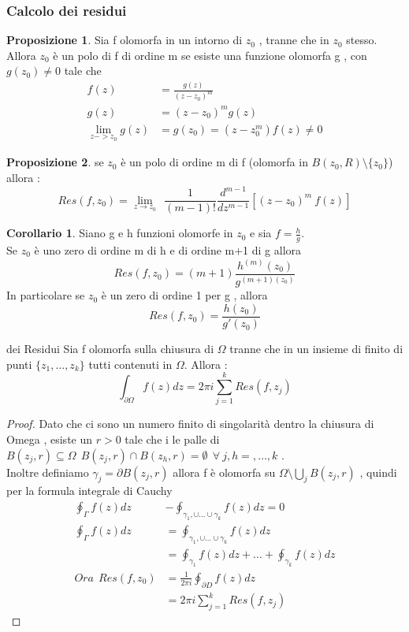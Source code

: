 \documentclass{article}
\theoremstyle{definition}
\newtheorem*{corollario}{Corollario}
\newtheorem*{proposizione}{Proposizione}
\begin{document}
	\subsubsection{Calcolo dei residui}
	\begin{tcolorbox}
	\begin{proposizione}
		Sia f olomorfa in un intorno di $z_0$ , tranne che in $z_0$ stesso. Allora $z_0$ è un polo di f di ordine m se esiste una funzione olomorfa g , con $g(z_0)\neq 0$ tale che 
		\begin{align*}
		f(z)&=\frac{g(z)}{(z-z_0)^m} \\
		g(z)&=(z-z_0)^m g(z) \\
		\lim_{z->z_0}g(z)&=g(z_0)=(z-z_0^m)f(z)\neq 0 
	\end{align*}
	\end{proposizione}
\end{tcolorbox}
	\begin{proposizione}
		\item se $z_0$ è un polo di ordine m di f (olomorfa in $B(z_0,R)\setminus \{z_0\}$) allora :  $$Res(f,z_0)=\lim_{z\rightarrow z_0}\ \ \frac{1}{(m-1)!}\frac{d^{m-1}}{dz^{m-1}}\left[(z-z_0)^m \ f(z)\right]$$
	\end{proposizione}

	\begin{corollario}
		Siano g e h funzioni olomorfe in $z_0$ e sia $f=\frac{h}{g}$.\\Se $z_0$ è uno zero di ordine m di h e di ordine m+1 di g allora 
		$$Res(f,z_0)=(m+1)\frac{h^{(m)}(z_0)}{g^{(m+1)(z_0)}}$$
		In particolare se $z_0$ è un zero di ordine 1 per g , allora 
		$$Res(f,z_0)=\frac{h(z_0)}{g'(z_0)}$$
	\end{corollario}
\begin{teo}{dei Residui}{}
	Sia f olomorfa sulla chiusura di $\Omega$ tranne che in un insieme di finito di punti $\{z_1,\dots,z_k\}$ tutti contenuti in $\Omega$. Allora : 
	$$\int_{\partial \Omega}f(z)dz=2\pi i \sum_{j=1}^{k}Res(f,z_j)$$
\end{teo}
\begin{proof}
	Dato che ci sono un numero finito di singolarità dentro la chiusura di Omega , esiste un $r>0$ tale che i le palle di $B(z_j,r) \subseteq \Omega  \ \  B(z_j,r)\cap B(z_h,r) = \emptyset \ \ \forall \ j,h =  , \dots , k$ .\\ Inoltre definiamo $\gamma_j=\partial B(z_j,r)$ allora f è olomorfa su $\Omega \setminus \bigcup_j B(z_j,r) $ , quindi per la formula integrale di Cauchy 
	\begin{align*}
		 \oint_{\Gamma}f(z)dz&-\oint_{\gamma_1 , \cup \dots \cup \gamma_k}f(z)dz=0  \\ 
		  \oint_{\Gamma}f(z)dz&=\oint_{\gamma_1 , \cup \dots \cup \gamma_k}f(z)dz \\
		  &= \oint_{\gamma_1}f(z)dz + \dots + \oint_{\gamma_k}f(z)dz \\ 
		  Ora  \ \ Res(f,z_0)& =\frac{1}{2 \pi i}\oint_{\partial D}f(z)dz\\ 
		  &=2 \pi i \sum_{j=1}^{k}Res(f,z_j)
	\end{align*}
\end{proof}
\end{document}
